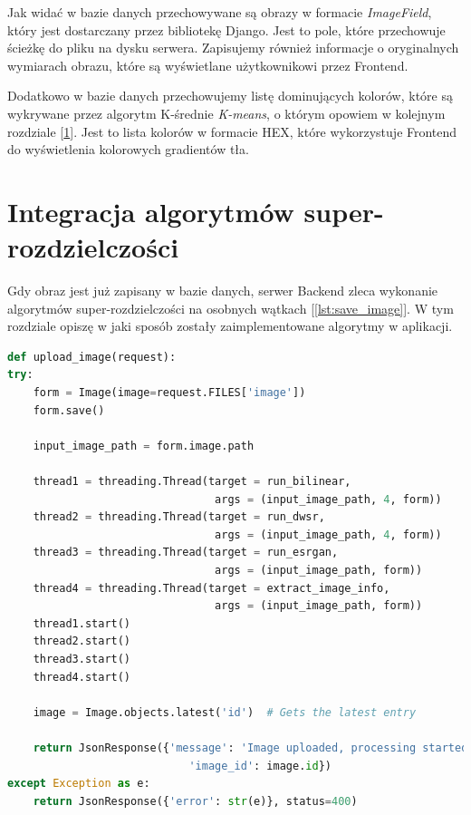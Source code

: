 Jak widać w bazie danych przechowywane są obrazy w formacie \textit{ImageField}, który jest dostarczany przez bibliotekę Django. Jest to pole, które przechowuje ścieżkę do pliku na dysku serwera. Zapisujemy również informacje o oryginalnych wymiarach obrazu, które są wyświetlane użytkownikowi przez Frontend. 

Dodatkowo w bazie danych przechowujemy listę dominujących kolorów, które są wykrywane przez algorytm K-średnie \textit{K-means}, o którym opowiem w kolejnym rozdziale [\ref{sec:implementation-s-r}]. Jest to lista kolorów w formacie HEX, które wykorzystuje Frontend do wyświetlenia kolorowych gradientów tła.


\newpage
\section{Integracja algorytmów super-rozdzielczości} \label{sec:implementation-s-r}

Gdy obraz jest już zapisany w bazie danych, serwer Backend zleca wykonanie algorytmów super-rozdzielczości na osobnych wątkach [\ref{lst:save_image}]. W tym rozdziale opiszę w jaki sposób zostały zaimplementowane algorytmy w aplikacji.

\begin{lstlisting}[language=Python, caption=Obsługa zapisu i przetwarzania obrazów., label={lst:save_image}]
def upload_image(request):
try:
    form = Image(image=request.FILES['image'])
    form.save()

    input_image_path = form.image.path
    
    thread1 = threading.Thread(target = run_bilinear, 
                                args = (input_image_path, 4, form))
    thread2 = threading.Thread(target = run_dwsr, 
                                args = (input_image_path, 4, form))
    thread3 = threading.Thread(target = run_esrgan, 
                                args = (input_image_path, form))
    thread4 = threading.Thread(target = extract_image_info, 
                                args = (input_image_path, form))
    thread1.start()
    thread2.start()
    thread3.start()
    thread4.start()

    image = Image.objects.latest('id')  # Gets the latest entry

    return JsonResponse({'message': 'Image uploaded, processing started', 
                            'image_id': image.id})
except Exception as e:
    return JsonResponse({'error': str(e)}, status=400)
\end{lstlisting}

